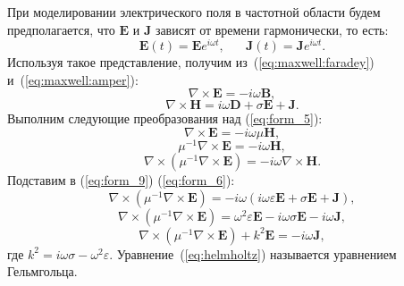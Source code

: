 \documentclass[a4paper,14pt]{article}
\begin{document}
При моделировании электрического поля в частотной области будем предполагается, что $\mathbf{E}$ и $\mathbf{J}$ зависят от времени гармонически, то есть:
\begin{equation*}
	\mathbf{E}(t) = \mathbf{E} e^{i \omega t} , \text{~~~~~} \mathbf{J}(t) = \mathbf{J} e^{i \omega t} .
\end{equation*}
Используя такое представление, получим из~(\ref{eq:maxwell:faradey}) и~(\ref{eq:maxwell:amper}):
\begin{equation}
	\nabla \times \mathbf{E} = - i \omega \mathbf{B} , \label{eq:form_5}
\end{equation}
\begin{equation}
	\nabla \times \mathbf{H} = i \omega \mathbf{D} + \sigma \mathbf{E} + \mathbf{J} . \label{eq:form_6}
\end{equation}
Выполним следующие преобразования над (\ref{eq:form_5}):
\begin{equation*}
	\nabla \times \mathbf{E} = - i \omega \mu \mathbf{H} ,
\end{equation*}
\begin{equation*}
	\mu^{-1} \nabla \times \mathbf{E} = - i \omega \mathbf{H} ,
\end{equation*}
\begin{equation}
	\nabla \times ( \mu^{-1} \nabla \times \mathbf{E} ) = - i \omega \nabla \times \mathbf{H} . \label{eq:form_9}
\end{equation}
Подставим в (\ref{eq:form_9}) (\ref{eq:form_6}):\nopagebreak
\begin{equation*}
	\nabla \times ( \mu^{-1} \nabla \times \mathbf{E} ) = - i \omega ( i \omega \varepsilon \mathbf{E} + \sigma \mathbf{E} + \mathbf{J} ) ,
\end{equation*}
\begin{equation*}
	\nabla \times ( \mu^{-1} \nabla \times \mathbf{E} ) = \omega^{2} \varepsilon \mathbf{E} - i \omega \sigma \mathbf{E} - i \omega \mathbf{J} ,
\end{equation*}
\begin{equation}
	\nabla \times ( \mu^{-1} \nabla \times \mathbf{E} ) + k^{2} \mathbf{E} = - i \omega \mathbf{J} , \label{eq:helmholtz}
\end{equation}
где $k^{2} = i \omega \sigma - \omega^{2} \varepsilon$. Уравнение~(\ref{eq:helmholtz}) называется уравнением Гельмгольца.
\end{document}
